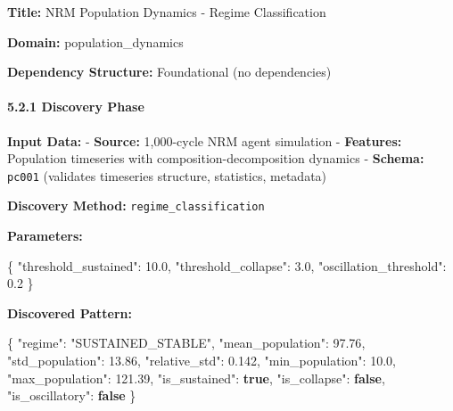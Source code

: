 \documentclass[
]{article}
\newenvironment{Shaded}{}{}
\newcommand{\DataTypeTok}[1]{\textcolor[rgb]{0.56,0.13,0.00}{#1}}
\newcommand{\FloatTok}[1]{\textcolor[rgb]{0.25,0.63,0.44}{#1}}
\newcommand{\FunctionTok}[1]{\textcolor[rgb]{0.02,0.16,0.49}{#1}}
\newcommand{\KeywordTok}[1]{\textcolor[rgb]{0.00,0.44,0.13}{\textbf{#1}}}
\newcommand{\StringTok}[1]{\textcolor[rgb]{0.25,0.44,0.63}{#1}}
\begin{document}
\textbf{Title:} NRM Population Dynamics - Regime Classification

\textbf{Domain:} population\_dynamics

\textbf{Dependency Structure:} Foundational (no dependencies)

\paragraph{5.2.1 Discovery Phase}\label{discovery-phase}

\textbf{Input Data:} - \textbf{Source:} 1,000-cycle NRM agent simulation
- \textbf{Features:} Population timeseries with
composition-decomposition dynamics - \textbf{Schema:} \texttt{pc001}
(validates timeseries structure, statistics, metadata)

\textbf{Discovery Method:} \texttt{regime\_classification}

\textbf{Parameters:}

\begin{Shaded}
\begin{Highlighting}[]
\FunctionTok{\{}
  \DataTypeTok{"threshold\_sustained"}\FunctionTok{:} \FloatTok{10.0}\FunctionTok{,}
  \DataTypeTok{"threshold\_collapse"}\FunctionTok{:} \FloatTok{3.0}\FunctionTok{,}
  \DataTypeTok{"oscillation\_threshold"}\FunctionTok{:} \FloatTok{0.2}
\FunctionTok{\}}
\end{Highlighting}
\end{Shaded}

\textbf{Discovered Pattern:}

\begin{Shaded}
\begin{Highlighting}[]
\FunctionTok{\{}
  \DataTypeTok{"regime"}\FunctionTok{:} \StringTok{"SUSTAINED\_STABLE"}\FunctionTok{,}
  \DataTypeTok{"mean\_population"}\FunctionTok{:} \FloatTok{97.76}\FunctionTok{,}
  \DataTypeTok{"std\_population"}\FunctionTok{:} \FloatTok{13.86}\FunctionTok{,}
  \DataTypeTok{"relative\_std"}\FunctionTok{:} \FloatTok{0.142}\FunctionTok{,}
  \DataTypeTok{"min\_population"}\FunctionTok{:} \FloatTok{10.0}\FunctionTok{,}
  \DataTypeTok{"max\_population"}\FunctionTok{:} \FloatTok{121.39}\FunctionTok{,}
  \DataTypeTok{"is\_sustained"}\FunctionTok{:} \KeywordTok{true}\FunctionTok{,}
  \DataTypeTok{"is\_collapse"}\FunctionTok{:} \KeywordTok{false}\FunctionTok{,}
  \DataTypeTok{"is\_oscillatory"}\FunctionTok{:} \KeywordTok{false}
\FunctionTok{\}}
\end{Highlighting}
\end{Shaded}
\end{document}
